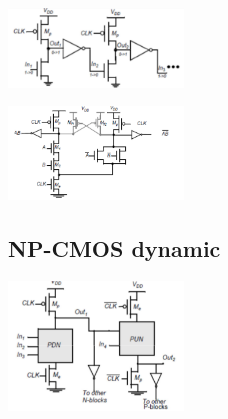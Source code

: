 \centering
\includegraphics[width=0.35\textwidth]{C9_8.png}\\
\raggedright

\centering
\includegraphics[width=0.35\textwidth]{C9_9.png}\\
\raggedright



\subsection{NP-CMOS dynamic}

\centering
\includegraphics[width=0.35\textwidth]{C9_10.png}\\
\raggedright

